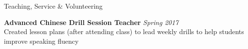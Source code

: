\documentclass{resume}
\begin{document}
\begin{rSection}{Teaching, Service \& Volunteering}

{\bf Advanced Chinese Drill Session Teacher} \hfill {\em Spring 2017} \\
{ Created lesson plans (after attending class) to lead weekly drills to help students improve speaking fluency}











\end{rSection}
\end{document}
